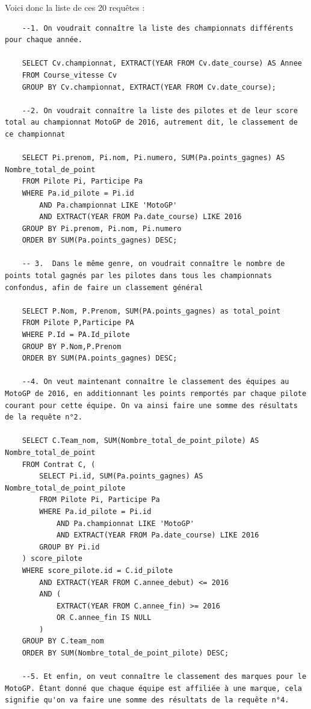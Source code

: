 \documentclass[12pt,a4paper]{article}
\newenvironment{code}{\captionsetup{type=listing}}{}
\begin{document}
Voici donc la liste de ces 20 requêtes :
\begin{code}
    \begin{verbatim}
    --1. On voudrait connaître la liste des championnats différents pour chaque année.
    
    SELECT Cv.championnat, EXTRACT(YEAR FROM Cv.date_course) AS Annee
    FROM Course_vitesse Cv
    GROUP BY Cv.championnat, EXTRACT(YEAR FROM Cv.date_course);
    
    --2. On voudrait connaître la liste des pilotes et de leur score total au championnat MotoGP de 2016, autrement dit, le classement de ce championnat

    SELECT Pi.prenom, Pi.nom, Pi.numero, SUM(Pa.points_gagnes) AS Nombre_total_de_point
    FROM Pilote Pi, Participe Pa
    WHERE Pa.id_pilote = Pi.id
        AND Pa.championnat LIKE 'MotoGP'
        AND EXTRACT(YEAR FROM Pa.date_course) LIKE 2016
    GROUP BY Pi.prenom, Pi.nom, Pi.numero
    ORDER BY SUM(Pa.points_gagnes) DESC;
    
    -- 3.  Dans le même genre, on voudrait connaître le nombre de points total gagnés par les pilotes dans tous les championnats confondus, afin de faire un classement général
    
    SELECT P.Nom, P.Prenom, SUM(PA.points_gagnes) as total_point
    FROM Pilote P,Participe PA
    WHERE P.Id = PA.Id_pilote
    GROUP BY P.Nom,P.Prenom
    ORDER BY SUM(PA.points_gagnes) DESC;
    
    --4. On veut maintenant connaître le classement des équipes au MotoGP de 2016, en additionnant les points remportés par chaque pilote courant pour cette équipe. On va ainsi faire une somme des résultats de la requête n°2.

    SELECT C.Team_nom, SUM(Nombre_total_de_point_pilote) AS Nombre_total_de_point
    FROM Contrat C, (
        SELECT Pi.id, SUM(Pa.points_gagnes) AS Nombre_total_de_point_pilote
        FROM Pilote Pi, Participe Pa
        WHERE Pa.id_pilote = Pi.id
            AND Pa.championnat LIKE 'MotoGP'
            AND EXTRACT(YEAR FROM Pa.date_course) LIKE 2016
        GROUP BY Pi.id
    ) score_pilote
    WHERE score_pilote.id = C.id_pilote
        AND EXTRACT(YEAR FROM C.annee_debut) <= 2016
        AND (
            EXTRACT(YEAR FROM C.annee_fin) >= 2016
            OR C.annee_fin IS NULL
        )
    GROUP BY C.team_nom
    ORDER BY SUM(Nombre_total_de_point_pilote) DESC;
    
    --5. Et enfin, on veut connaître le classement des marques pour le MotoGP. Étant donné que chaque équipe est affiliée à une marque, cela signifie qu'on va faire une somme des résultats de la requête n°4.


\end{verbatim}
\end{code}
\end{document}
